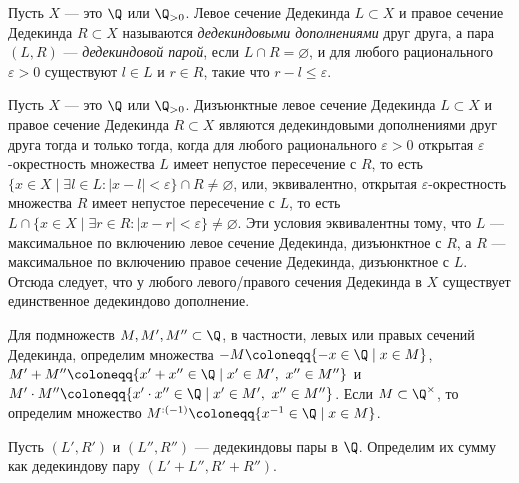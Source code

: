 \documentclass[
	extrafontsizes,
	11pt,
	hyphens,
]{memoir}
\begin{document}
\begin{definition}
Пусть \(X\) --- это \(\Q\) или \(\Q_{>0}\).
Левое сечение Дедекинда \(L \subset X\) и правое сечение Дедекинда \(R \subset X\) называются \emph{дедекиндовыми дополнениями} друг друга, а пара \((L,R)\) --- \emph{дедекиндовой парой}, если \(L \cap R = \varnothing\), и для любого рационального \(\varepsilon > 0\) существуют \(l \in L\) и \(r \in R\), такие что \(r - l \leq \varepsilon\).
\end{definition}

\begin{observation}
Пусть \(X\) --- это \(\Q\) или \(\Q_{>0}\).
Дизъюнктные левое сечение Дедекинда \(L \subset X\) и правое сечение Дедекинда \(R \subset X\) являются дедекиндовыми дополнениями друг друга тогда и только тогда, когда для любого рационального \(\varepsilon > 0\) открытая \(\varepsilon\)-окрестность множества \(L\) имеет непустое пересечение с \(R\),
то есть
\(\{x \in X \mid \exists l \in L : |x-l| < \varepsilon\} \cap R \neq \varnothing\),
или, эквивалентно,
открытая \(\varepsilon\)-окрестность множества \(R\) имеет непустое пересечение с \(L\),
то есть
\(L \cap \{x \in X \mid \exists r \in R : |x-r| < \varepsilon\} \neq \varnothing\).
Эти условия эквивалентны тому, что \(L\) --- максимальное по включению левое сечение Дедекинда, дизъюнктное с \(R\), а \(R\) --- максимальное по включению правое сечение Дедекинда, дизъюнктное с \(L\).
Отсюда следует, что у любого ле\-во\-го/пра\-во\-го сечения Дедекинда в \(X\) существует единственное дедекиндово дополнение.
\end{observation}

\begin{definition}
Для подмножеств \(M, M', M'' \subset \Q\),
в частности, левых или правых сечений Дедекинда,
определим множества
\(-M \coloneqq \{-x \in \Q \mid x \in M\}\),
\(M' + M'' \coloneqq \{x' + x'' \in \Q \mid x' \in M',\ x'' \in M''\}\) и
\(M' \cdot M'' \coloneqq \{x' \cdot x'' \in \Q \mid x' \in M',\ x'' \in M''\}\).
Если \(M \subset \Q^\times\), то определим множество
\(M^{:(-1)} \coloneqq \{x^{-1} \in \Q \mid x \in M\}\).
\end{definition}

\begin{definition}
Пусть \((L',R')\) и \((L'',R'')\) --- дедекиндовы пары в \(\Q\).
Определим их сумму как дедекиндову пару
\((L' + L'', R' + R'')\).
\end{definition}
\end{document}
